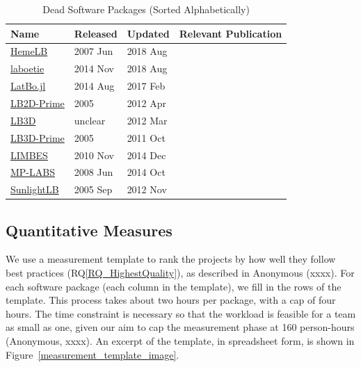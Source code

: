 \documentclass[final, 3p, times, authoryear]{elsarticle}
\newcommand{\rqref}[1]{RQ\ref{#1}}
\begin{document}
\begin{table}[ht!]
	\begin{center}
		\begin{tabular}{ p{3cm}p{2cm}p{2cm}p{5.5cm} }
			\toprule
			Name & Released & Updated & Relevant Publication\\
			\midrule
			\href{https://github.com/UCL/hemelb}{HemeLB} & 2007 Jun & 2018 Aug&\citep{mazzeo2008hemelb}\\
			\href{https://github.com/maxlevesque/laboetie}{laboetie} & 2014 Nov & 2018 Aug&\citep{levesque2013accounting}\\		
			\href{https://github.com/UCL/LatBo.jl}{LatBo.jl} & 2014 Aug & 2017 Feb&\\
			\href{https://code.google.com/p/lb2d-prime-dev/source}{LB2D-Prime} & 2005 & 2012 Apr&\\
			\href{http://ccs.chem.ucl.ac.uk/sites/ccs.chem.ucl.ac.uk/themes/ccs2/files/lb3d-2012-03-12.tgz}{LB3D} & unclear & 2012 Mar&\citep{schmieschek2017lb3d}\\
			\href{https://code.google.com/archive/p/lb3d-prime-dev/source}{LB3D-Prime} & 2005 & 2011 Oct&\\
			\href{https://code.google.com/archive/p/limbes/source}{LIMBES} & 2010 Nov & 2014 Dec&\\
			\href{https://github.com/carlosrosales/mplabs}{MP-LABS} & 2008 Jun & 2014 Oct&\\
			\href{https://sourceforge.net/projects/sunlightlb/files/latest/download}{SunlightLB} & 2005 Sep & 2012 Nov&\\
			\bottomrule
		\end{tabular}
		\caption{Dead Software Packages (Sorted Alphabetically)} \label{deadpackages}
	\end{center}
\end{table}

\subsection{Quantitative Measures} \label{empiricalmeasures}

We use a measurement template to rank the projects by how well they follow best
practices (\rqref{RQ_HighestQuality}), as described in Anonymous (xxxx)\footnotemark[1].
For each software package (each column in the template), we fill in the rows of
the template. This process takes about two hours per package, with a cap of four
hours. The time constraint is necessary so that the workload is feasible for a
team as small as one, given our aim to cap the measurement phase at 160
person-hours (Anonymous, xxxx)\footnotemark[1]. %
An excerpt of the template, in spreadsheet
form, is shown in Figure~\ref{measurement_template_image}.
\end{document}
